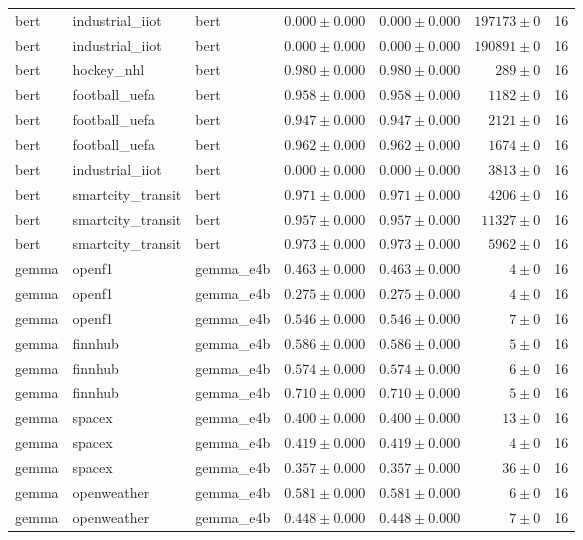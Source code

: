 \begin{table}[htbp]
\begin{tabular}{l l l r r r r}
bert & industrial\_iiot & bert & $0.000\pm0.000$ & $0.000\pm0.000$ & $197173\pm0$ & 16 \\
bert & industrial\_iiot & bert & $0.000\pm0.000$ & $0.000\pm0.000$ & $190891\pm0$ & 16 \\
bert & hockey\_nhl & bert & $0.980\pm0.000$ & $0.980\pm0.000$ & $289\pm0$ & 16 \\
bert & football\_uefa & bert & $0.958\pm0.000$ & $0.958\pm0.000$ & $1182\pm0$ & 16 \\
bert & football\_uefa & bert & $0.947\pm0.000$ & $0.947\pm0.000$ & $2121\pm0$ & 16 \\
bert & football\_uefa & bert & $0.962\pm0.000$ & $0.962\pm0.000$ & $1674\pm0$ & 16 \\
bert & industrial\_iiot & bert & $0.000\pm0.000$ & $0.000\pm0.000$ & $3813\pm0$ & 16 \\
bert & smartcity\_transit & bert & $0.971\pm0.000$ & $0.971\pm0.000$ & $4206\pm0$ & 16 \\
bert & smartcity\_transit & bert & $0.957\pm0.000$ & $0.957\pm0.000$ & $11327\pm0$ & 16 \\
bert & smartcity\_transit & bert & $0.973\pm0.000$ & $0.973\pm0.000$ & $5962\pm0$ & 16 \\
gemma & openf1 & gemma\_e4b & $0.463\pm0.000$ & $0.463\pm0.000$ & $4\pm0$ & 16 \\
gemma & openf1 & gemma\_e4b & $0.275\pm0.000$ & $0.275\pm0.000$ & $4\pm0$ & 16 \\
gemma & openf1 & gemma\_e4b & $0.546\pm0.000$ & $0.546\pm0.000$ & $7\pm0$ & 16 \\
gemma & finnhub & gemma\_e4b & $0.586\pm0.000$ & $0.586\pm0.000$ & $5\pm0$ & 16 \\
gemma & finnhub & gemma\_e4b & $0.574\pm0.000$ & $0.574\pm0.000$ & $6\pm0$ & 16 \\
gemma & finnhub & gemma\_e4b & $0.710\pm0.000$ & $0.710\pm0.000$ & $5\pm0$ & 16 \\
gemma & spacex & gemma\_e4b & $0.400\pm0.000$ & $0.400\pm0.000$ & $13\pm0$ & 16 \\
gemma & spacex & gemma\_e4b & $0.419\pm0.000$ & $0.419\pm0.000$ & $4\pm0$ & 16 \\
gemma & spacex & gemma\_e4b & $0.357\pm0.000$ & $0.357\pm0.000$ & $36\pm0$ & 16 \\
gemma & openweather & gemma\_e4b & $0.581\pm0.000$ & $0.581\pm0.000$ & $6\pm0$ & 16 \\
gemma & openweather & gemma\_e4b & $0.448\pm0.000$ & $0.448\pm0.000$ & $7\pm0$ & 16 \\

\end{tabular}
\end{table}
